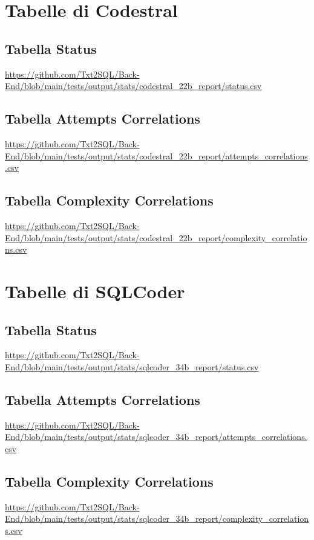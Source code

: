 \section{Tabelle di Codestral}

\subsection{Tabella Status}
\label{tab:status_codestral}
\url{https://github.com/Txt2SQL/Back-End/blob/main/tests/output/stats/codestral_22b_report/status.csv}

\subsection{Tabella Attempts Correlations}
\label{tab:attempts_codestral}
\url{https://github.com/Txt2SQL/Back-End/blob/main/tests/output/stats/codestral_22b_report/attempts_correlations.csv}

\subsection{Tabella Complexity Correlations}
\label{tab:complexity_codestral}
\url{https://github.com/Txt2SQL/Back-End/blob/main/tests/output/stats/codestral_22b_report/complexity_correlations.csv}


\section{Tabelle di SQLCoder}

\subsection{Tabella Status}
\label{tab:status_sqlcoder}
\url{https://github.com/Txt2SQL/Back-End/blob/main/tests/output/stats/sqlcoder_34b_report/status.csv}

\subsection{Tabella Attempts Correlations}
\label{tab:attempts_sqlcoder}
\url{https://github.com/Txt2SQL/Back-End/blob/main/tests/output/stats/sqlcoder_34b_report/attempts_correlations.csv}

\subsection{Tabella Complexity Correlations}
\label{tab:complexity_sqlcoder}
\url{https://github.com/Txt2SQL/Back-End/blob/main/tests/output/stats/sqlcoder_34b_report/complexity_correlations.csv}



